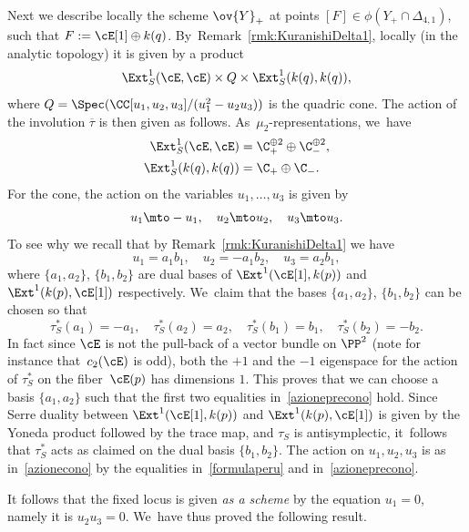Next we describe locally the scheme $\ov{Y}_+$ at points $[F]\in\phi(Y_+\cap \Delta_{4,1})$, \ie such that $F:=\cE[1]\oplus k(q)$. By~Remark~\ref{rmk:KuranishiDelta1}, locally (in the analytic topology) it is given by a product
\[
\Ext^1_S(\cE,\cE)\times Q \times \Ext^1_S(k(q),k(q)),
\]
where $Q=\Spec(\CC[u_1,u_2,u_3]/(u_1^2-u_2u_3))$ is the quadric cone.
The action of the involution $\overline{\tau}$ is then given as follows. As~$\mu_2$-representations, we~have
\begin{align*}
\Ext^1_S(\cE,\cE) &= \C_{+}^{\oplus 2}\oplus \C_{-}^{\oplus 2},\\
\Ext^1_S(k(q),k(q)) &= \C_{+}\oplus \C_{-}.
\end{align*}
For the cone, the action on the variables $u_1,\dots,u_3$ is given by
\begin{equation}\label{azionecono}
u_1\mto -u_1,\quad u_2\mto u_2,\quad u_3\mto u_3.
\end{equation}
To see why we recall that by Remark~\ref{rmk:KuranishiDelta1} we have
\begin{equation}\label{formulaperu}
u_1=a_1 b_1,\quad u_2=-a_1 b_2,\quad u_3=a_2 b_1,
\end{equation}
where $\{a_1,a_2\}$, $\{b_1,b_2\}$ are dual bases of $\Ext^1(\cE[1],k(p))$ and $\Ext^1(k(p),\cE[1])$ respectively. We~claim that the bases $\{a_1,a_2\}$, $\{b_1,b_2\}$ can be chosen so that
\begin{equation}\label{azioneprecono}
\tau_S^{*}(a_1)=-a_1,\quad \tau_S^{*}(a_2)=a_2,\quad
\tau_S^{*}(b_1)=b_1,\quad \tau_S^{*}(b_2)=-b_2.
\end{equation}
In fact since $\cE$ is not the pull-back of a vector bundle on $\PP^2$ (note for instance that~$c_2(\cE)$ is odd), both the $+1$ and the $-1$ eigenspace for the action of $\tau_S^{*}$ on the fiber~$\cE(p)$ has dimensions $1$.
This proves that we can choose a basis $\{a_1,a_2\}$ such that the first two equalities in~\eqref{azioneprecono} hold. Since Serre duality between $\Ext^1(\cE[1],k(p))$ and $\Ext^1(k(p),\cE[1])$ is given by the Yoneda product followed by the trace map, and $\tau_S$ is antisymplectic, it~follows that $\tau_S^{*}$ acts as claimed on the dual basis $\{b_1,b_2\}$.
The action on $u_1,u_2,u_3$ is as in~\eqref{azionecono} by the equalities in~\eqref{formulaperu} and in~\eqref{azioneprecono}.

It follows that the fixed locus is given \emph{as a scheme} by the equation $u_1=0$, namely it is $u_2u_3=0$. We~have thus proved the following result.

